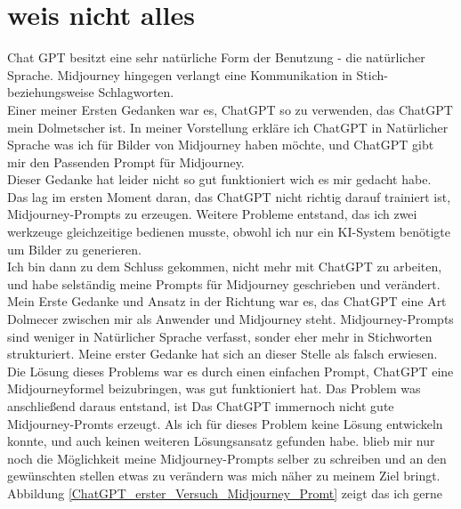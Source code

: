 \section{weis nicht alles}
Chat GPT besitzt eine sehr natürliche Form der Benutzung - die natürlicher Sprache. Midjourney hingegen verlangt eine Kommunikation in Stich- beziehungsweise Schlagworten.
\\
Einer meiner Ersten Gedanken war es, ChatGPT so zu verwenden, das ChatGPT mein Dolmetscher ist. In meiner Vorstellung erkläre ich ChatGPT in Natürlicher Sprache was ich für Bilder von Midjourney haben möchte, und ChatGPT  gibt mir den Passenden Prompt für Midjourney.
\\
Dieser Gedanke hat leider nicht so gut funktioniert wich es mir gedacht habe. Das lag im ersten Moment daran, das ChatGPT nicht richtig darauf trainiert ist, Midjourney-Prompts zu erzeugen. Weitere Probleme entstand, das ich zwei werkzeuge gleichzeitige bedienen musste, obwohl ich nur ein KI-System benötigte um Bilder zu generieren.
\\
Ich bin dann zu dem Schluss gekommen, nicht mehr mit ChatGPT zu arbeiten, und habe selständig meine Prompts für Midjourney geschrieben und verändert.
\\
Mein Erste Gedanke und Ansatz in der Richtung war es, das ChatGPT eine Art Dolmecer zwischen mir als Anwender und Midjourney steht.
Midjourney-Prompts sind weniger in Natürlicher Sprache verfasst, sonder eher mehr in Stichworten strukturiert.
Meine erster Gedanke hat sich an dieser Stelle als falsch erwiesen. Die Lösung dieses Problems war es durch einen einfachen Prompt, ChatGPT eine Midjourneyformel beizubringen, was gut funktioniert hat.
Das Problem was anschließend daraus entstand, ist Das ChatGPT immernoch nicht gute Midjourney-Promts erzeugt.
Als ich für dieses Problem keine Lösung entwickeln konnte, und auch keinen weiteren Lösungsansatz gefunden habe. blieb mir nur noch die Möglichkeit meine Midjourney-Prompts selber zu schreiben und an den gewünschten stellen etwas zu verändern was mich näher zu meinem Ziel bringt.
Abbildung \ref{ChatGPT_erster_Versuch_Midjourney_Promt} zeigt das ich gerne
